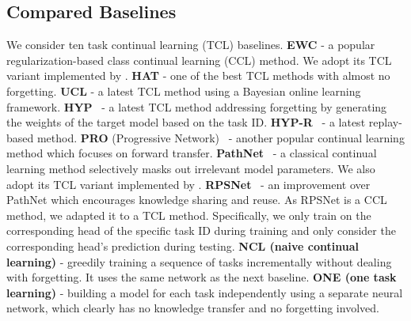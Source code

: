 \documentclass{article}
\begin{document}
\subsection{Compared Baselines}
We consider ten task continual learning (TCL) baselines.  
\textbf{EWC} \citep{Kirkpatrick2017overcoming} - {\color{black}a popular regularization-based class continual learning (CCL) method. We adopt its TCL variant implemented by \cite{Serra2018overcoming}}.
\textbf{HAT} 
\citep{Serra2018overcoming} - one of the best TCL methods with almost no forgetting. 
\textbf{UCL}
\citep{DBLP:conf/nips/AhnCLM19} - a latest TCL method using a Bayesian online learning framework. 
\textbf{HYP}~\citep{von2019continual} - a latest TCL method addressing forgetting by generating the weights of the target model based on the task ID.
\textbf{HYP-R}~\citep{von2019continual} - a latest replay-based method. 
\textbf{PRO} (Progressive Network)~\citep{DBLP:journals/corr/RusuRDSKKPH16} - another popular continual learning method which focuses on forward transfer. 
{\textbf{PathNet}~\citep{Fernando2017pathnet} - a classical continual learning method selectively masks out irrelevant model parameters}. We also adopt its TCL variant implemented by \cite{Serra2018overcoming}. 
{\color{black}\textbf{RPSNet}~\citep{rajasegaran2019neurIPS} - an improvement over PathNet which encourages knowledge sharing and reuse. As RPSNet is a CCL method, we adapted it to a TCL method. Specifically, we only train on the corresponding head of the specific task ID during training and only consider the corresponding head's prediction during testing. }
\textbf{NCL (naive continual learning)} - greedily training a sequence of tasks incrementally without dealing with forgetting. It uses the same network as the next baseline.
\textbf{ONE (one task learning)} - building a model for each task independently using a separate neural network, which clearly has no knowledge transfer and no forgetting involved. 
\end{document}

